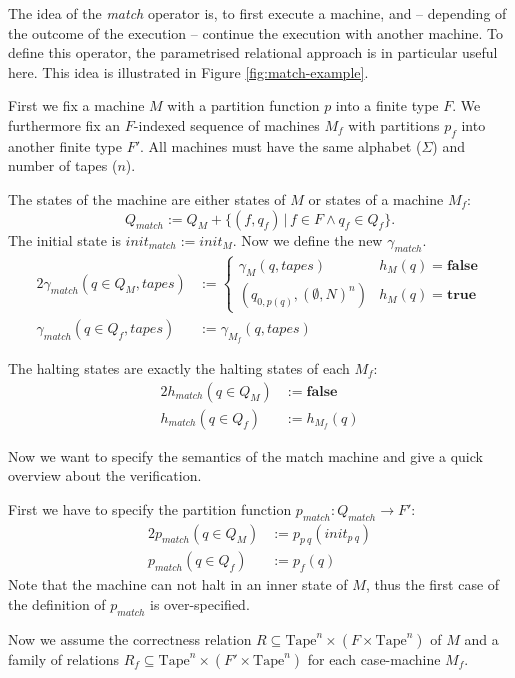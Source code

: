 \documentclass{psartcl}
\newcommand{\setOf}[1]{\bigl \{ #1 \bigr \}}
\newcommand{\setMap}[2]{\setOf{#1 \,\big|\, #2}}
\newcommand{\from}{:}
\renewcommand{\to}{\rightarrow}
\renewcommand{\None}{\emptyset}
\newcommand{\true}{\mathbf{true}}
\newcommand{\false}{\mathbf{false}}
\newcommand{\Tape}{\txt{Tape}}
\newcommand{\Tapes}[1]{\Tape^{#1}}
\newcommand{\txt}[1]{\text{#1}}
\begin{document}
The idea of the \emph{match} operator is, to first execute a machine, and -- depending of the outcome of the execution -- continue the execution with
another machine.  To define this operator, the parametrised relational approach is in particular useful here.  This idea is illustrated in Figure
\ref{fig:match-example}.

First we fix a machine $M$ with a partition function $p$ into a finite type $F$.
We furthermore fix an $F$-indexed sequence of machines $M_f$ with partitions $p_f$ into another finite type $F'$.
All machines must have the same alphabet ($\Sigma$) and number of tapes ($n$).

The states of the machine are either states of $M$ or states of a machine $M_f$:
$$Q_{match} := Q_M + \setMap{(f, q_f)}{f \in F \land q_f \in Q_f}.$$
The initial state is $init_{match} := init_M$.  Now we define the new $\gamma_{match}$.
\begin{alignat*}{2}
  \gamma_{match}(q \in Q_M, tapes) &:=
  \begin{cases}
    \gamma_{M}(q, tapes) & h_M(q) = \false \\
    (q_{0, p(q)}, (\None, N)^n) & h_M(q) = \true
  \end{cases} \\
  \gamma_{match}(q \in Q_f, tapes) &:= \gamma_{M_f}(q, tapes)
\end{alignat*}

The halting states are exactly the halting states of each $M_f$:
\begin{alignat*}{2}
  h_{match}(q \in Q_M) &:= \false \\
  h_{match}(q \in Q_f) &:= h_{M_f}(q)
\end{alignat*}

Now we want to specify the semantics of the match machine and give a quick overview about the verification.

First we have to specify the partition function $p_{match} \from Q_{match} \to F'$:
\begin{alignat*}{2}
  p_{match}(q \in Q_M) &:= p_{p~q} (init_{p~q}) \\
  p_{match}(q \in Q_f) &:= p_f(q)
\end{alignat*}
Note that the machine can not halt in an inner state of $M$, thus the first case of the definition of $p_{match}$ is over-specified.

Now we assume the correctness relation $R \subseteq \Tapes{n} \times (F \times \Tapes{n})$ of $M$ and a family of relations
$R_f \subseteq \Tapes{n} \times (F' \times \Tapes{n})$ for each case-machine $M_f$.
\end{document}
